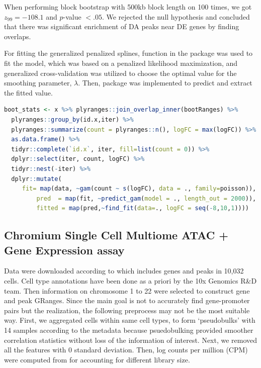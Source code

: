 \documentclass{article}
\begin{document}
When performing block bootstrap with 500kb block length on 100 times, we got $z_{99}=-108.1$ and $\textit{p}$-value $<.05$. We rejected the null hypothesis and concluded that there was significant enrichment of DA peaks near DE genes by finding overlaps.

For fitting the generalized penalized splines,  function in the  package was used to fit the model, which was based on a penalized likelihood maximization, and generalized cross-validation was utilized to choose the optimal value for the smoothing parameter, $\lambda$. Then,  package was implemented to predict and extract the fitted value. 

\begin{lstlisting}[language=R]
boot_stats <- x %>% plyranges::join_overlap_inner(bootRanges) %>%
  plyranges::group_by(id.x,iter) %>%
  plyranges::summarize(count = plyranges::n(), logFC = max(logFC)) %>%
  as.data.frame() %>%
  tidyr::complete(`id.x`, iter, fill=list(count = 0)) %>%
  dplyr::select(iter, count, logFC) %>%
  tidyr::nest(-iter) %>%
  dplyr::mutate(
	 fit= map(data, ~gam(count ~ s(logFC), data = ., family=poisson)),
         pred  = map(fit, ~predict_gam(model = ., length_out = 2000)),
         fitted = map(pred,~find_fit(data=., logFC = seq(-8,10,1))))

\end{lstlisting} 

\subsection{Chromium Single Cell Multiome ATAC + Gene Expression assay}
Data were downloaded according to \citet{Vignette} which includes genes and peaks in 10,032 cells. Cell type annotations have been done as a priori by the 10x Genomics R\&D team. Then information on chromosome 1 to 22 were selected to construct gene and peak GRanges. Since the main goal is not to accurately find gene-promoter pairs but the realization, the following preprocess may not be the most suitable way. First, we aggregated cells within same cell types, to form ‘pseudobulks’ with 14 samples according to the metadata because psuedobulking provided smoother correlation statistics without loss of the information of interest. Next, we removed all the features with 0 standard deviation. Then, log counts per million (CPM) were computed from  for accounting for different library size.
\end{document}
